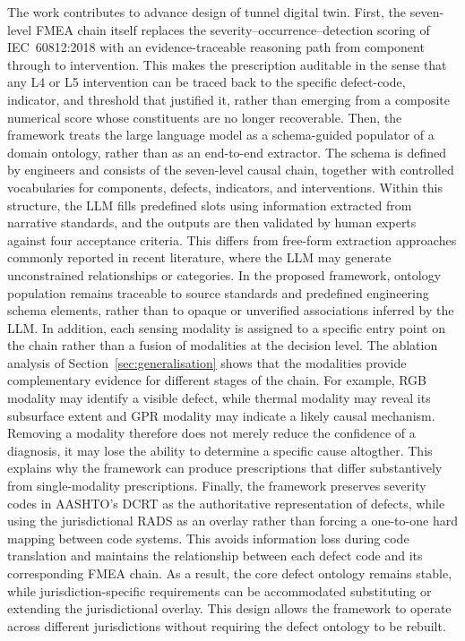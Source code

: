 \documentclass[11pt,a4paper]{article}
\begin{document}
The work contributes to advance design of tunnel digital twin. First, the seven-level FMEA chain itself replaces the severity–occurrence–detection scoring of IEC~60812:2018 with an evidence-traceable reasoning path from component through to intervention. This makes the prescription auditable in the sense that any L4 or L5 intervention can be traced back to the specific defect-code, indicator, and threshold that justified it, rather than emerging from a composite numerical score whose constituents are no longer recoverable. Then, the framework treats the large language model as a schema-guided populator of a domain ontology, rather than as an end-to-end extractor. The schema is defined by engineers and consists of the seven-level causal chain, together with controlled vocabularies for components, defects, indicators, and interventions. Within this structure, the LLM fills predefined slots using information extracted from narrative standards, and the outputs are then validated by human experts against four acceptance criteria. This differs from free-form extraction approaches commonly reported in recent literature, where the LLM may generate unconstrained relationships or categories. In the proposed framework, ontology population remains traceable to source standards and predefined engineering schema elements, rather than to opaque or unverified associations inferred by the LLM. In addition, each sensing modality is assigned to a specific entry point on the chain rather than a fusion of modalities at the decision level. The ablation analysis of Section~\ref{sec:generalisation} shows that the modalities provide complementary evidence for different stages of the chain. For example, RGB modality may identify a visible defect, while thermal modality may reveal its subsurface extent and GPR modality may indicate a likely causal mechanism. Removing a modality therefore does not merely reduce the confidence of a diagnosis, it may lose the ability to determine a specific cause altogther. This explains why the framework can produce prescriptions that differ substantively from single-modality prescriptions. Finally, the framework preserves  severity codes in AASHTO's DCRT as the authoritative representation of defects, while using the jurisdictional RADS as an overlay rather than forcing a one-to-one hard mapping between code systems. This avoids information loss during code translation and maintains the relationship between each defect code and its corresponding FMEA chain. As a result, the core defect ontology remains stable, while jurisdiction-specific requirements can be accommodated substituting or extending the jurisdictional overlay. This design allows the framework to operate across different jurisdictions without requiring the defect ontology to be rebuilt.
\end{document}
